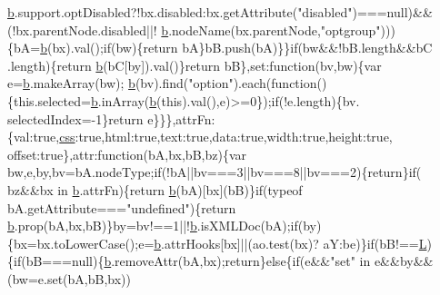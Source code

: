 \begin{DoxyCode}
      \hyperlink{a00039_aa4026ad5544b958e54ce5e106fa1c805}{b}.support.optDisabled?!bx.disabled:bx.getAttribute(\textcolor{stringliteral}{"disabled"})===null)&&(!bx.parentNode.disabled||!
      \hyperlink{a00039_aa4026ad5544b958e54ce5e106fa1c805}{b}.nodeName(bx.parentNode,\textcolor{stringliteral}{"optgroup"})))\{bA=\hyperlink{a00039_aa4026ad5544b958e54ce5e106fa1c805}{b}(bx).val();\textcolor{keywordflow}{if}(bw)\{\textcolor{keywordflow}{return} bA\}bB.push(bA)\}\}\textcolor{keywordflow}{if}(bw&&!bB.length&&bC
      .length)\{\textcolor{keywordflow}{return} \hyperlink{a00039_aa4026ad5544b958e54ce5e106fa1c805}{b}(bC[by]).val()\}\textcolor{keywordflow}{return} bB\},set:\textcolor{keyword}{function}(bv,bw)\{var e=\hyperlink{a00039_aa4026ad5544b958e54ce5e106fa1c805}{b}.makeArray(bw);
      \hyperlink{a00039_aa4026ad5544b958e54ce5e106fa1c805}{b}(bv).find(\textcolor{stringliteral}{"option"}).each(\textcolor{keyword}{function}()\{this.selected=\hyperlink{a00039_aa4026ad5544b958e54ce5e106fa1c805}{b}.inArray(\hyperlink{a00039_aa4026ad5544b958e54ce5e106fa1c805}{b}(\textcolor{keyword}{this}).val(),e)>=0\});\textcolor{keywordflow}{if}(!e.length)\{bv.
      selectedIndex=-1\}\textcolor{keywordflow}{return} e\}\}\},attrFn:\{val:\textcolor{keyword}{true},\hyperlink{a00039_a89ad527fcd82c01ebb587332f5b4fcd4}{css}:\textcolor{keyword}{true},html:\textcolor{keyword}{true},text:\textcolor{keyword}{true},data:\textcolor{keyword}{true},width:\textcolor{keyword}{true},height:\textcolor{keyword}{true},
      offset:\textcolor{keyword}{true}\},attr:\textcolor{keyword}{function}(bA,bx,bB,bz)\{var bw,e,by,bv=bA.nodeType;\textcolor{keywordflow}{if}(!bA||bv===3||bv===8||bv===2)\{\textcolor{keywordflow}{return}\}\textcolor{keywordflow}{if}(
      bz&&bx in \hyperlink{a00039_aa4026ad5544b958e54ce5e106fa1c805}{b}.attrFn)\{\textcolor{keywordflow}{return} \hyperlink{a00039_aa4026ad5544b958e54ce5e106fa1c805}{b}(bA)[bx](bB)\}\textcolor{keywordflow}{if}(typeof bA.getAttribute===\textcolor{stringliteral}{"undefined"})\{\textcolor{keywordflow}{return} 
      \hyperlink{a00039_aa4026ad5544b958e54ce5e106fa1c805}{b}.prop(bA,bx,bB)\}by=bv!==1||!\hyperlink{a00039_aa4026ad5544b958e54ce5e106fa1c805}{b}.isXMLDoc(bA);\textcolor{keywordflow}{if}(by)\{bx=bx.toLowerCase();e=\hyperlink{a00039_aa4026ad5544b958e54ce5e106fa1c805}{b}.attrHooks[bx]||(ao.test(bx)?
      aY:be)\}\textcolor{keywordflow}{if}(bB!==\hyperlink{a00039_a38ee4c0b5f4fe2a18d0c783af540d253}{L})\{\textcolor{keywordflow}{if}(bB===null)\{\hyperlink{a00039_aa4026ad5544b958e54ce5e106fa1c805}{b}.removeAttr(bA,bx);\textcolor{keywordflow}{return}\}\textcolor{keywordflow}{else}\{\textcolor{keywordflow}{if}(e&&\textcolor{stringliteral}{"set"} in e&&by&&(bw=e.set(bA,bB,bx))

\end{DoxyCode}
